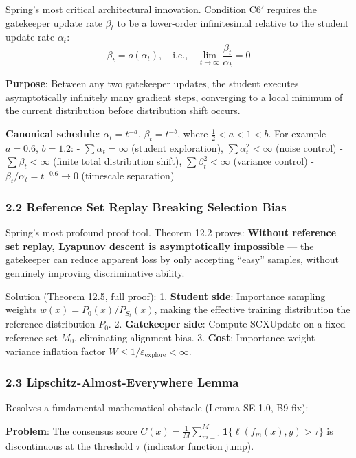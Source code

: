 \documentclass[
  12pt,
]{article}
\begin{document}
Spring's most critical architectural innovation. Condition C6$'$ requires the gatekeeper update rate $\beta_t$ to be a lower-order infinitesimal relative to the student update rate $\alpha_t$:
\[\beta_t = o(\alpha_t), \quad \text{i.e.,} \quad \lim_{t\to\infty} \frac{\beta_t}{\alpha_t} = 0\]

\textbf{Purpose}: Between any two gatekeeper updates, the student executes asymptotically infinitely many gradient steps, converging to a local minimum of the current distribution before distribution shift occurs.

\textbf{Canonical schedule}: $\alpha_t = t^{-a}$, $\beta_t = t^{-b}$, where $\frac{1}{2} < a < 1 < b$. For example $a = 0.6$, $b = 1.2$:
- $\sum \alpha_t = \infty$ (student exploration), $\sum \alpha_t^2 < \infty$ (noise control)
- $\sum \beta_t < \infty$ (finite total distribution shift), $\sum \beta_t^2 < \infty$ (variance control)
- $\beta_t / \alpha_t = t^{-0.6} \to 0$ (timescale separation)

\subsubsection{2.2 Reference Set Replay Breaking Selection Bias}\label{reference-set-replay}

Spring's most profound proof tool. Theorem 12.2 proves: \textbf{Without reference set replay, Lyapunov descent is asymptotically impossible} --- the gatekeeper can reduce apparent loss by only accepting ``easy'' samples, without genuinely improving discriminative ability.

Solution (Theorem 12.5, full proof):
1. \textbf{Student side}: Importance sampling weights $w(x) = P_0(x) / P_{S_t}(x)$, making the effective training distribution the reference distribution $P_0$.
2. \textbf{Gatekeeper side}: Compute SCXUpdate on a fixed reference set $M_0$, eliminating alignment bias.
3. \textbf{Cost}: Importance weight variance inflation factor $W \leq 1/\varepsilon_{\text{explore}} < \infty$.

\subsubsection{2.3 Lipschitz-Almost-Everywhere Lemma}\label{lipschitz-almost-everywhere}

Resolves a fundamental mathematical obstacle (Lemma SE-1.0, B9 fix):

\textbf{Problem}: The consensus score $C(x) = \frac{1}{M}\sum_{m=1}^M \mathbf{1}\{\ell(f_m(x), y) > \tau\}$ is discontinuous at the threshold $\tau$ (indicator function jump).
\end{document}
